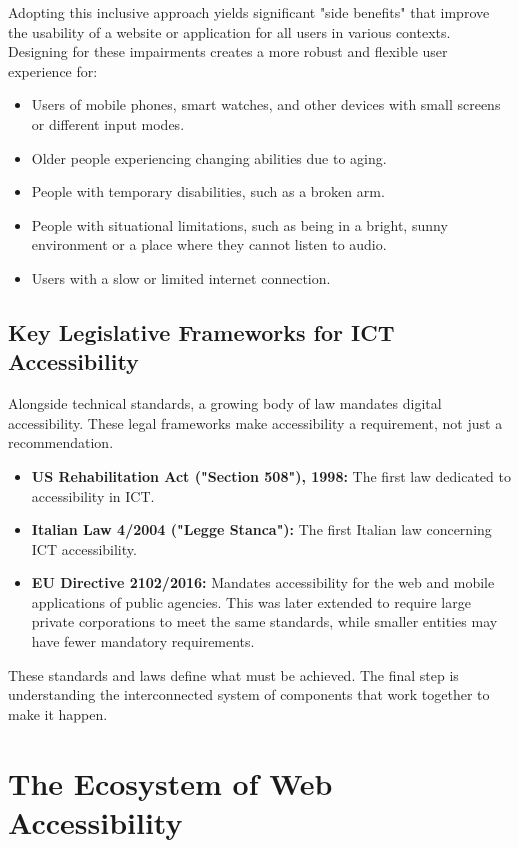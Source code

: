 \documentclass{scrbook}
\begin{document}
Adopting this inclusive approach yields significant "side benefits" that improve the usability of a website or application for all users in various contexts. Designing for these impairments creates a more robust and flexible user experience for:

\begin{itemize}
    \item Users of mobile phones, smart watches, and other devices with small screens or different input modes.
    \item Older people experiencing changing abilities due to aging.
    \item People with temporary disabilities, such as a broken arm.
    \item People with situational limitations, such as being in a bright, sunny environment or a place where they cannot listen to audio.
    \item Users with a slow or limited internet connection.
\end{itemize}

\section{Key Legislative Frameworks for ICT Accessibility}

Alongside technical standards, a growing body of law mandates digital accessibility. These legal frameworks make accessibility a requirement, not just a recommendation.

\begin{itemize}
    \item \textbf{US Rehabilitation Act ("Section 508"), 1998:} The first law dedicated to accessibility in ICT.
    \item \textbf{Italian Law 4/2004 ("Legge Stanca"):} The first Italian law concerning ICT accessibility.
    \item \textbf{EU Directive 2102/2016:} Mandates accessibility for the web and mobile applications of public agencies. This was later extended to require large private corporations to meet the same standards, while smaller entities may have fewer mandatory requirements.
\end{itemize}

These standards and laws define what must be achieved. The final step is understanding the interconnected system of components that work together to make it happen.

\chapter{The Ecosystem of Web Accessibility}
\end{document}
